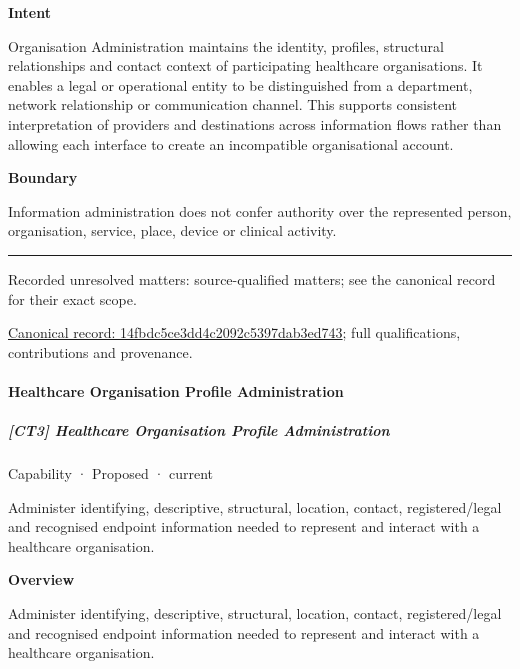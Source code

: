 \textbf{Intent}



Organisation Administration maintains the identity, profiles, structural relationships and contact context of participating healthcare organisations. It enables a legal or operational entity to be distinguished from a department, network relationship or communication channel. This supports consistent interpretation of providers and destinations across information flows rather than allowing each interface to create an incompatible organisational account.



\textbf{Boundary}



Information administration does not confer authority over the represented person, organisation, service, place, device or clinical activity.



\medskip\hrule\medskip

{\small Recorded unresolved matters: source-qualified matters; see the canonical record for their exact scope.}\par
{\footnotesize \href{../../../../continuum/strategy/capability/14fbdc5ce3dd4c2092c5397dab3ed743.md}{Canonical record: 14fbdc5ce3dd4c2092c5397dab3ed743}; full qualifications, contributions and provenance.}\par
\paragraph{Healthcare Organisation Profile Administration}

\subparagraph{[CT3] Healthcare Organisation Profile Administration}

\label{element:f2de9e9394b849f2943355c7a2882a15}
{\small Capability · Proposed · current}\par

Administer identifying, descriptive, structural, location, contact, registered/legal and recognised endpoint information needed to represent and interact with a healthcare organisation.



\textbf{Overview}



Administer identifying, descriptive, structural, location, contact, registered/legal and recognised endpoint information needed to represent and interact with a healthcare organisation.



